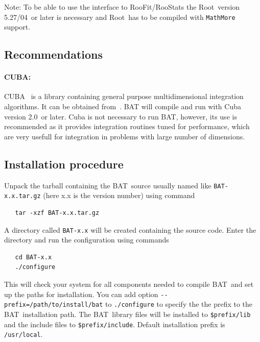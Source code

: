 \documentclass[11pt, a4paper]{article}
\newcommand{\bat}{{\sc BAT}}
\newcommand{\Root}{{\sc Root}}
\newcommand{\RooStatsVersion}{5.27/04}
\newcommand{\CubaVersion}{2.0}
\begin{document}
\noindent
Note: To be able to use the interface to RooFit/RooStats the \Root\
version \RooStatsVersion\ or later is necessary and \Root\ has to be compiled
with \verb|MathMore| support.


\subsection{Recommendations}

\enlargethispage{1cm}

\paragraph{CUBA:}
CUBA~\cite{CUBA} is a library containing general purpose
multidimensional integration algorithms. It can be obtained
from~\cite{CUBAweb}. BAT will compile and run with Cuba version
\CubaVersion\ or later. Cuba is not necessary to run BAT, however, its
use is recommended as it provides integration routines tuned for
performance, which are very usefull for integration in problems with
large number of dimensions.


\subsection{Installation procedure}

Unpack the tarball containing the \bat\ source usually named like
\verb|BAT-x.x.tar.gz| (here x.x is the version number) using command
%
\begin{verbatim}
   tar -xzf BAT-x.x.tar.gz
\end{verbatim}
%
A directory called \verb|BAT-x.x| will be created containing the source code.
Enter the directory and run the configuration using commands
%
\begin{verbatim}
   cd BAT-x.x
   ./configure
\end{verbatim}

\noindent
This will check your system for all components needed to compile \bat\
and set up the paths for installation. You can add option
\verb|--prefix=/path/to/install/bat| to \verb|./configure| to specify
the the prefix to the \bat\ installation path. The \bat\ library files
will be installed to \verb|$prefix/lib| and the include files to
\verb|$prefix/include|. Default installation prefix is
\verb|/usr/local|. \\
\end{document}
